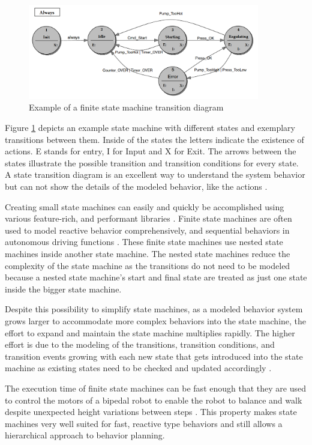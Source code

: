 \begin{figure}[ht]
	\centering
	\includegraphics[width=0.9\textwidth]{images/fsm.png} 
	\caption{Example of a finite state machine transition diagram \cite{wagner2006}}
	\label{fig:fsm}
\end{figure}

Figure \ref{fig:fsm} depicts an example state machine with different states and exemplary transitions between them. Inside of the states the letters indicate the existence of actions. E stands for entry, I for Input and X for Exit. The arrows between the states illustrate the possible transition and transition conditions for every state. A state transition diagram is an excellent way to understand the system behavior but can not show the details of the modeled behavior, like the actions \cite{wagner2006}. 

Creating small state machines can easily and quickly be accomplished using various feature-rich, and performant libraries \cite{fourakis2014}. 
Finite state machines are often used to model reactive behavior comprehensively, and sequential behaviors in autonomous driving functions \cite{ziegler2014}. These finite state machines use nested state machines inside another state machine. The nested state machines reduce the complexity of the state machine as the transitions do not need to be modeled because a nested state machine's start and final state are treated as just one state inside the bigger state machine. 

Despite this possibility to simplify state machines, as a modeled behavior system grows larger to accommodate more complex behaviors into the state machine, the effort to expand and maintain the state machine multiplies rapidly. The higher effort is due to the modeling of the transitions, transition conditions, and transition events growing with each new state that gets introduced into the state machine as existing states need to be checked and updated accordingly \cite{conner2017}. 

The execution time of finite state machines can be fast enough that they are used to control the motors of a bipedal robot to enable the robot to balance and walk despite unexpected height variations between steps \cite{park2013}. This property makes state machines very well suited for fast, reactive type behaviors and still allows a hierarchical approach to behavior planning.

